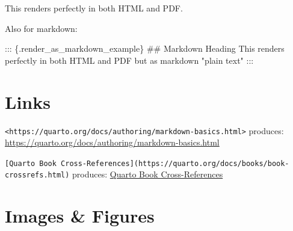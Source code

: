 \documentclass[
  11pt,
  letterpaper,
]{book}
\newenvironment{Shaded}{\begin{snugshade}}{\end{snugshade}}
\newcommand{\FunctionTok}[1]{\textcolor[rgb]{0.28,0.35,0.67}{#1}}
\newcommand{\NormalTok}[1]{\textcolor[rgb]{0.00,0.23,0.31}{#1}}
\begin{document}
\begin{tcolorbox}[enhanced jigsaw, coltitle=black, opacitybacktitle=0.6, titlerule=0mm, colframe=quarto-callout-note-color-frame, breakable, leftrule=.75mm, colback=white, left=2mm, opacityback=0, colbacktitle=quarto-callout-note-color!10!white, bottomtitle=1mm, toptitle=1mm, title=\textcolor{quarto-callout-note-color}{\faInfo}\hspace{0.5em}{Important Note2}, arc=.35mm, bottomrule=.15mm, rightrule=.15mm, toprule=.15mm]

This renders perfectly in both HTML and PDF.

\end{tcolorbox}

Also for markdown:

\begin{Shaded}
\begin{Highlighting}[]
\NormalTok{::: \{.render\_as\_markdown\_example\}}
\FunctionTok{\#\# Markdown Heading}
\NormalTok{This renders perfectly in both HTML and PDF but as markdown "plain text"}
\NormalTok{:::}
\end{Highlighting}
\end{Shaded}

\section{Links}\label{links-1}

\texttt{\textless{}https://quarto.org/docs/authoring/markdown-basics.html\textgreater{}}
produces: \url{https://quarto.org/docs/authoring/markdown-basics.html}

\texttt{{[}Quarto\ Book\ Cross-References{]}(https://quarto.org/docs/books/book-crossrefs.html)}
produces:
\href{https://quarto.org/docs/books/book-crossrefs.html}{Quarto Book
Cross-References}

\section*{Images \& Figures}\label{sec-figures1}

\end{document}
